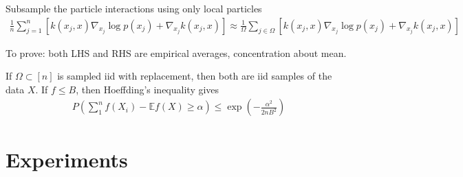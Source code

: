 \documentclass{article}
\newcommand{\ex}{\mathbb{E}}
\begin{document}
Subsample the particle interactions using only local particles
\begin{align}
    \frac{1}{n} \sum^{n}_{j=1} \left[
        k(x_j, x) \nabla_{x_j} \log p(x_j) + \nabla_{x_j} k(x_j, x)
    \right]
    \approx \frac{1}{\Omega} \sum_{j \in \Omega}  \left[
        k(x_j, x) \nabla_{x_j} \log p(x_j) + \nabla_{x_j} k(x_j, x)
    \right]
\end{align}

To prove: both LHS and RHS are empirical averages, concentration about mean.

If $\Omega \subset [n]$ is sampled iid with replacement, then both are iid
samples of the data $X$. If $f \leq B$, then Hoeffding's inequality gives
\begin{align}
    P(\sum_1^n f(X_i) - \ex f(X) \geq \alpha) \leq \exp \left( - \frac{\alpha^2}{2 n B^2}\right)
\end{align}

\section{Experiments}
\label{sec:experiments}



\printbibliography
\end{document}
